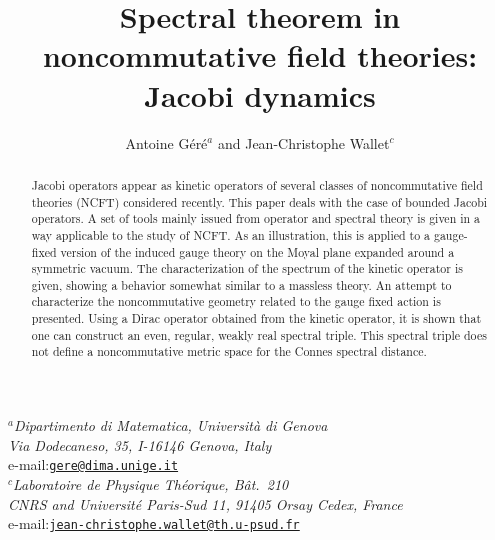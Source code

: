\documentclass[a4paper,11pt,twoside]{article}
\makeatletter
\numberwithin{equation}{section}
\theoremstyle{nonumberplain}
\newcommand{\institute}[1]{\newcommand{\@institute}{#1}}
\renewcommand{\maketitle}{
%
\vspace*{0.5\baselineskip}
%
{%
\center\LARGE\noindent\@title\par
}%
%
\vspace{1.5\baselineskip}
%
{%
\center\normalsize\noindent\ignorespaces\@author\par
}%
%
\vspace{0.5\baselineskip}
%
{%
\center\normalsize\ignorespaces\@institute\par
}%
%
\vspace{2\baselineskip}
%
}%
\makeatother
\begin{document}

\title{Spectral theorem in noncommutative field theories: Jacobi dynamics}

\author{Antoine G\'er\'e$^a$ and Jean-Christophe Wallet$^c$}

\institute{%
%
\textit{$^a$Dipartimento di Matematica, Universit\`a di Genova\\
Via Dodecaneso, 35, I-16146 Genova, Italy}\\
e-mail:\href{mailto:gere@dima.unige.it}{\texttt{gere@dima.unige.it}}\\[1ex]%
%
\textit{$^c$Laboratoire de Physique Th\'eorique, B\^at.\ 210\\
CNRS and Universit\'e Paris-Sud 11,  91405 Orsay Cedex, France}\\
e-mail:\href{mailto:jean-christophe.wallet@th.u-psud.fr}{\texttt{jean-christophe.wallet@th.u-psud.fr}}%
%
}%

\maketitle


{{
%
\small
%


}}


\begin{abstract}
Jacobi operators appear as kinetic operators of several classes of noncommutative field theories (NCFT) considered recently. This paper deals with the case of bounded Jacobi operators. A set of tools mainly issued from operator and spectral theory is given in a way applicable to the study of NCFT. As an illustration, this is applied to a gauge-fixed version of the induced gauge theory on the Moyal plane expanded around a symmetric vacuum. The characterization of the spectrum of the kinetic operator is given, showing a behavior somewhat similar to a massless theory. An attempt to characterize the noncommutative geometry related to the gauge fixed action is presented. Using a Dirac operator obtained from the kinetic operator, it is shown that one can construct an even, regular, weakly real spectral triple. This spectral triple does not define a noncommutative metric space for the Connes spectral distance.
\end{abstract}
\end{document}
